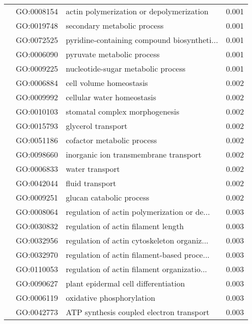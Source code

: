 \begin{longtable}{lllr}
   & GO:0008154 &     actin polymerization or depolymerization &         0.001 \\
   & GO:0019748 &                  secondary metabolic process &         0.001 \\
   & GO:0072525 &  pyridine-containing compound biosyntheti... &         0.001 \\
   & GO:0006090 &                   pyruvate metabolic process &         0.001 \\
   & GO:0009225 &           nucleotide-sugar metabolic process &         0.001 \\
   & GO:0006884 &                      cell volume homeostasis &         0.002 \\
   & GO:0009992 &                   cellular water homeostasis &         0.002 \\
   & GO:0010103 &               stomatal complex morphogenesis &         0.002 \\
   & GO:0015793 &                           glycerol transport &         0.002 \\
   & GO:0051186 &                   cofactor metabolic process &         0.002 \\
   & GO:0098660 &        inorganic ion transmembrane transport &         0.002 \\
   & GO:0006833 &                              water transport &         0.002 \\
   & GO:0042044 &                              fluid transport &         0.002 \\
   & GO:0009251 &                     glucan catabolic process &         0.002 \\
   & GO:0008064 &  regulation of actin polymerization or de... &         0.003 \\
   & GO:0030832 &          regulation of actin filament length &         0.003 \\
   & GO:0032956 &  regulation of actin cytoskeleton organiz... &         0.003 \\
   & GO:0032970 &  regulation of actin filament-based proce... &         0.003 \\
   & GO:0110053 &  regulation of actin filament organizatio... &         0.003 \\
   & GO:0090627 &         plant epidermal cell differentiation &         0.003 \\
   & GO:0006119 &                    oxidative phosphorylation &         0.003 \\
   & GO:0042773 &     ATP synthesis coupled electron transport &         0.003 \\

\end{longtable}
